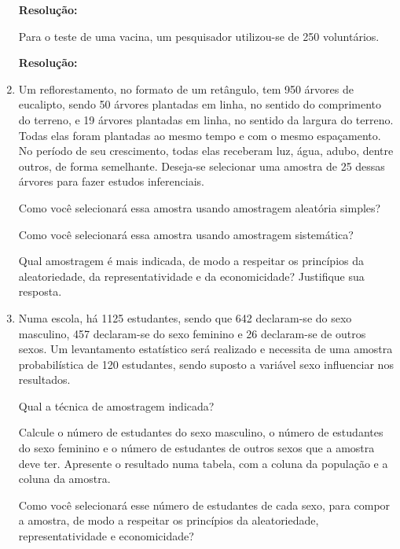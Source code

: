 \begin{enumerate}
	\textbf{Resolução:}~
	
	\subitem Para o teste de uma vacina, um pesquisador utilizou-se de 250 voluntários.
	
	\textbf{Resolução:}~
	
	\item Um reflorestamento, no formato de um retângulo, tem 950 árvores de eucalipto, sendo
50 árvores plantadas em linha, no sentido do comprimento do terreno, e 19 árvores
plantadas em linha, no sentido da largura do terreno. Todas elas foram plantadas ao mesmo
tempo e com o mesmo espaçamento. No período de seu crescimento, todas elas
receberam luz, água, adubo, dentre outros, de forma semelhante. Deseja-se selecionar
uma amostra de 25 dessas árvores para fazer estudos inferenciais.
	
	\subitem Como você selecionará essa amostra usando amostragem aleatória simples?
	
	\subitem Como você selecionará essa amostra usando amostragem sistemática?
	
	\subitem Qual amostragem é mais indicada, de modo a respeitar os princípios da aleatoriedade,
da representatividade e da economicidade? Justifique sua resposta.
	
	\item Numa escola, há 1125 estudantes, sendo que 642 declaram-se do sexo masculino, 457
declaram-se do sexo feminino e 26 declaram-se de outros sexos. Um levantamento estatístico
será realizado e necessita de uma amostra probabilística de 120 estudantes, sendo suposto a
variável sexo influenciar nos resultados.
	
	\subitem Qual a técnica de amostragem indicada?
	
	
	\subitem Calcule o número de estudantes do sexo masculino, o número de estudantes do sexo
feminino e o número de estudantes de outros sexos que a amostra deve ter. Apresente o
resultado numa tabela, com a coluna da população e a coluna da amostra.
	
	\subitem Como você selecionará esse número de estudantes de cada sexo, para compor a
amostra, de modo a respeitar os princípios da aleatoriedade, representatividade e
economicidade?
	

\end{enumerate}
